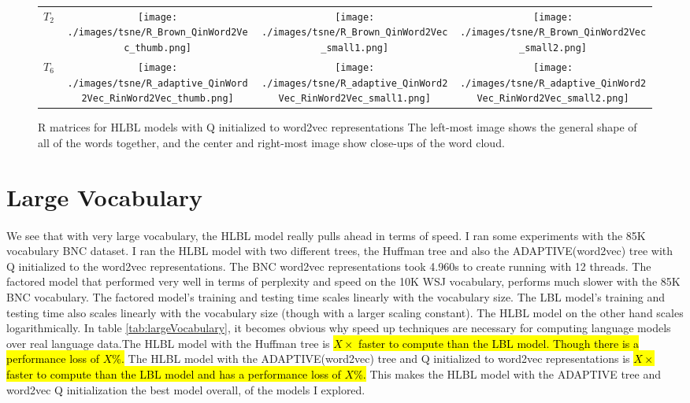 \begin{figure}[p]
\centering
\begin{tabular}{@{}C{2cm}ccc@{}}
$T_2$ &
\texttt{[image: ./images/tsne/R\_Brown\_QinWord2Vec\_thumb.png]} &
\texttt{[image: ./images/tsne/R\_Brown\_QinWord2Vec\_small1.png]} &
\texttt{[image: ./images/tsne/R\_Brown\_QinWord2Vec\_small2.png]}
\\
$T_6$ &
\texttt{[image: ./images/tsne/R\_adaptive\_QinWord2Vec\_RinWord2Vec\_thumb.png]} &
\texttt{[image: ./images/tsne/R\_adaptive\_QinWord2Vec\_RinWord2Vec\_small1.png]} &
\texttt{[image: ./images/tsne/R\_adaptive\_QinWord2Vec\_RinWord2Vec\_small2.png]}
\end{tabular}
\caption{R matrices for HLBL models with Q initialized to word2vec representations The left-most image shows the general shape of all of the words together, and the center and right-most image show close-ups of the word cloud.}
\label{fig:RcloudWord2Vec}
\end{figure}


\section{Large Vocabulary}
\paragraph{}
We see that with very large vocabulary, the HLBL model really pulls ahead in terms of speed. I ran some experiments with the 85K vocabulary BNC dataset.  I ran the HLBL model with two different trees, the Huffman tree and also the ADAPTIVE(word2vec) tree with Q initialized to the word2vec representations. The BNC word2vec representations took 4.960s to create running with 12 threads. 
The factored model that performed very well in terms of perplexity and speed on the 10K WSJ vocabulary, performs much slower with the 85K BNC vocabulary. The factored model's training and testing time scales linearly with the vocabulary size. The LBL model's training and testing time also scales linearly with the vocabulary size (though with a larger scaling constant). The HLBL model on the other hand scales logarithmically. In table \ref{tab:largeVocabulary}, it becomes obvious why speed up techniques are necessary for computing language models over real language data.The HLBL model with the Huffman tree is \hl{$X\times$ faster to compute than the LBL model. Though there is a performance loss of $X\%$.} The HLBL model with the ADAPTIVE(word2vec) tree and Q initialized to word2vec representations is \hl{$X\times$ faster to compute than the LBL model and has a performance loss of $X\%$.} This makes the HLBL model with the ADAPTIVE tree and word2vec Q initialization the best model overall, of the models I explored.

